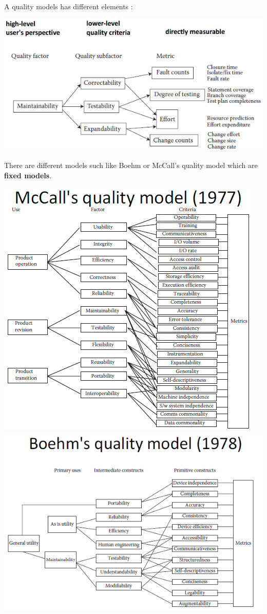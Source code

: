 \documentclass{article}
\begin{document}
\noindent A quality models has different elements :
\begin{center}
        \includegraphics[scale=0.65]{37.PNG}
\end{center}


\noindent There are different models such like Boehm or McCall's quality model which are \textbf{fixed models}.
\begin{center}
        \includegraphics[scale=0.6]{38.PNG}
        \includegraphics[scale=0.6]{39.PNG}
\end{center}
\end{document}
